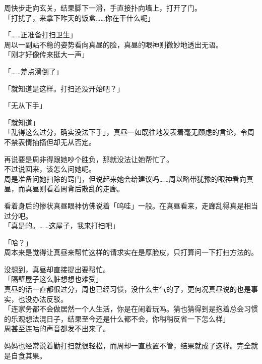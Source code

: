周快步走向玄关，结果脚下一滑，手直接扑向墙上，打开了门。\\

「打扰了，来拿下昨天的饭盒……你在干什么呢」

「……正准备打扫卫生」\\

周以一副站不稳的姿势看向真昼的脸，真昼的眼神则微妙地透出无语。\\

「刚才好像传来挺大一声」

「……差点滑倒了」

「就知道是这样。打扫还没开始吧？」

「无从下手」

「就知道」\\

「乱得这么过分，确实没法下手」，真昼一如既往地发表着毫无顾虑的言论，令周不禁表情抽搐但却无从否定。

再说要是周非得跟她吵个胜负，那就没法让她帮忙了。\\

不过说回来，该怎么问她呢。\\

周是准备问她扫除的窍门，但说起来她会给建议吗……周以略带犹豫的眼神看向真昼，而真昼则看着周背后散乱的走廊。

看着身后的惨状真昼眼神仿佛说着「呜哇」一般。在真昼看来，走廊乱得真是相当过分吧。\\

「真是的。……这屋子，我来打扫吧」

「哈？」\\

周本来是觉得让真昼来帮忙这样的请求实在是厚脸皮，只打算问一下打扫方法的。

没想到，真昼却直接提出要帮忙。\\

「隔壁屋子这么脏想想也难受」\\

真昼的话一直都很过分，周也已经习惯，没什么生气的了，更何况真昼说的也是事实，也没办法反驳。\\

「连家务都不会做居然一个人生活，你是在闹着玩吗。猜也猜得到是抱着总会习惯的乐观想法混日子，结果至今还是什么都不会，你稍稍反省一下怎么样」\\

周甚至连咕的声音都发不出来了。

妈妈也经常说着勤打扫就很轻松，而周却一直放置不管，结果就成了这样。完全就是自食其果。\\

